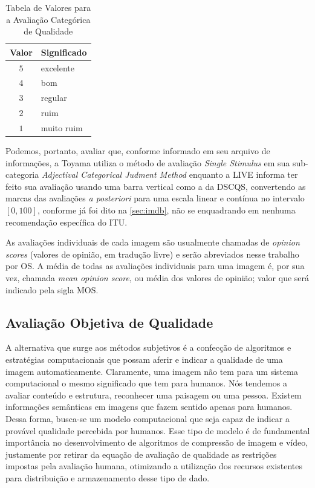 \begin{table}[htb]
	\footnotesize
	\caption[Avaliação de Qualidade]{Tabela de Valores para a Avaliação Categórica de Qualidade}
	\label{tab:avQual}
	\centering
	\begin{tabular}{ c | l }
		\textbf{Valor}	&	\textbf{Significado}		\\\hline %
		$5$		&	excelente	\\
		$4$		&	bom		\\
		$3$		&	regular		\\
		$2$		&	ruim		\\
		$1$		&	muito ruim	\\ \hline
	\end {tabular}
	\par
\end{table}

Podemos, portanto, avaliar que, conforme informado em seu arquivo de informações, a Toyama utiliza o método de avaliação \emph{Single Stimulus} em sua sub-categoria \emph{Adjectival Categorical Judment Method} enquanto a LIVE informa ter feito sua avaliação usando uma barra vertical como a da DSCQS, convertendo as marcas das avaliações \emph{a posteriori} para uma escala linear e contínua no intervalo $[0,100]$, conforme já foi dito na \autoref{sec:imdb}, não se enquadrando em nenhuma recomendação específica do ITU.

As avaliações individuais de cada imagem são usualmente chamadas de \emph{opinion scores} (valores de opinião, em tradução livre) e serão abreviados nesse trabalho por OS. A média de todas as avaliações individuais para uma imagem é, por sua vez, chamada \emph{mean opinion score}, ou média dos valores de opinião; valor que será indicado pela sigla MOS.


\subsection{Avaliação Objetiva de Qualidade}

A alternativa que surge aos métodos subjetivos é a confecção de algoritmos e estratégias computacionais que possam aferir e indicar a qualidade de uma imagem automaticamente. Claramente, uma imagem não tem para um sistema computacional o mesmo significado que tem para humanos. Nós tendemos a avaliar conteúdo e estrutura, reconhecer uma paisagem ou uma pessoa. Existem informações semânticas em imagens que fazem sentido apenas para humanos. Dessa forma, busca-se um modelo computacional que seja capaz de indicar a provável qualidade percebida por humanos. Esse tipo de modelo é de fundamental importância no desenvolvimento de algoritmos de compressão de imagem e vídeo, justamente por retirar da equação de avaliação de qualidade as restrições impostas pela avaliação humana, otimizando a utilização dos recursos existentes para distribuição e armazenamento desse tipo de dado.

